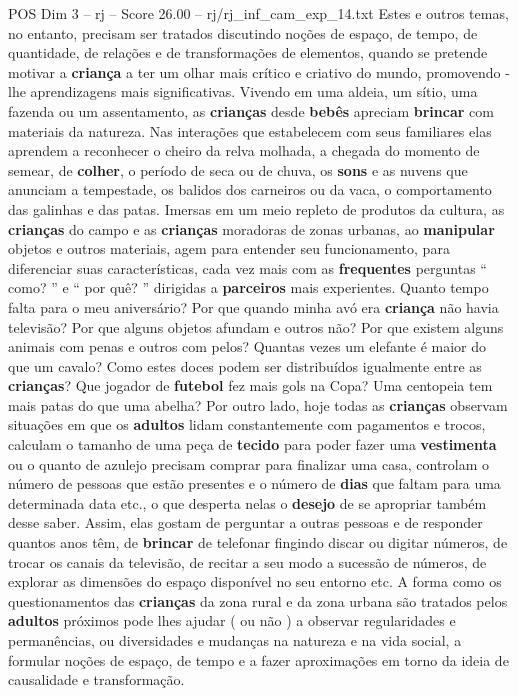 \begin{textsample}{POS Dim 3 – rj – Score 26.00 – rj/rj\_inf\_cam\_exp\_14.txt}
Estes e outros temas, no entanto, precisam ser tratados discutindo noções de espaço, de tempo, de quantidade, de relações e de transformações de elementos, quando se pretende motivar a \textbf{criança} a ter um olhar mais crítico e criativo do mundo, promovendo -lhe aprendizagens mais significativas.
Vivendo em uma aldeia, um sítio, uma fazenda ou um assentamento, as \textbf{crianças} desde \textbf{bebês} apreciam \textbf{brincar} com materiais da natureza.
Nas interações que estabelecem com seus familiares elas aprendem a reconhecer o cheiro da relva molhada, a chegada do momento de semear, de \textbf{colher}, o período de seca ou de chuva, os \textbf{sons} e as nuvens que anunciam a tempestade, os balidos dos carneiros ou da vaca, o comportamento das galinhas e das patas.
Imersas em um meio repleto de produtos da cultura, as \textbf{crianças} do campo e as \textbf{crianças} moradoras de zonas urbanas, ao \textbf{manipular} objetos e outros materiais, agem para entender seu funcionamento, para diferenciar suas características, cada vez mais com as \textbf{frequentes} perguntas “ como? ” e “ por quê? ” dirigidas a \textbf{parceiros} mais experientes.
Quanto tempo falta para o meu aniversário?
Por que quando minha avó era \textbf{criança} não havia televisão?
Por que alguns objetos afundam e outros não?
Por que existem alguns animais com penas e outros com pelos?
Quantas vezes um elefante é maior do que um cavalo?
Como estes doces podem ser distribuídos igualmente entre as \textbf{crianças}?
Que jogador de \textbf{futebol} fez mais gols na Copa?
Uma centopeia tem mais patas do que uma abelha?
Por outro lado, hoje todas as \textbf{crianças} observam situações em que os \textbf{adultos} lidam constantemente com pagamentos e trocos, calculam o tamanho de uma peça de \textbf{tecido} para poder fazer uma \textbf{vestimenta} ou o quanto de azulejo precisam comprar para finalizar uma casa, controlam o número de pessoas que estão presentes e o número de \textbf{dias} que faltam para uma determinada data etc., o que desperta nelas o \textbf{desejo} de se apropriar também desse saber.
Assim, elas gostam de perguntar a outras pessoas e de responder quantos anos têm, de \textbf{brincar} de telefonar fingindo discar ou digitar números, de trocar os canais da televisão, de recitar a seu modo a sucessão de números, de explorar as dimensões do espaço disponível no seu entorno etc.
A forma como os questionamentos das \textbf{crianças} da zona rural e da zona urbana são tratados pelos \textbf{adultos} próximos pode lhes ajudar ( ou não ) a observar regularidades e permanências, ou diversidades e mudanças na natureza e na vida social, a formular noções de espaço, de tempo e a fazer aproximações em torno da ideia de causalidade e transformação.

\end{textsample}
